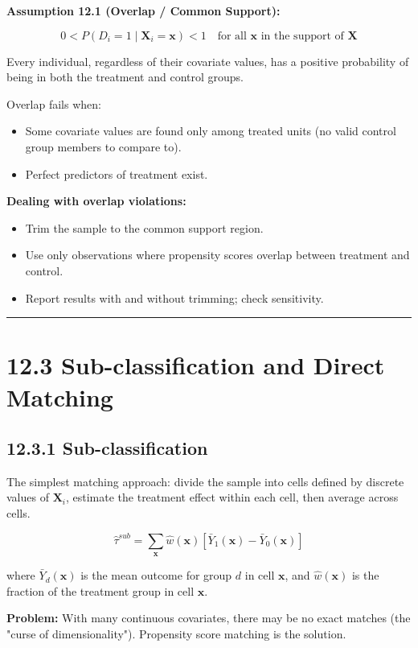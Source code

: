 \textbf{Assumption 12.1 (Overlap / Common Support):}

\[
0 < P(D_i = 1 \mid \mathbf{X}_i = \mathbf{x}) < 1 \quad \text{for all } \mathbf{x} \text{ in the support of } \mathbf{X}
\]

Every individual, regardless of their covariate values, has a positive probability of being in both the treatment and control groups.

Overlap fails when:
\begin{itemize}
\item Some covariate values are found only among treated units (no valid control group members to compare to).
\item Perfect predictors of treatment exist.
\end{itemize}

\textbf{Dealing with overlap violations:}
\begin{itemize}
\item Trim the sample to the common support region.
\item Use only observations where propensity scores overlap between treatment and control.
\item Report results with and without trimming; check sensitivity.
\end{itemize}

\medskip\hrule\medskip

\section{12.3 Sub-classification and Direct Matching}

\subsection{12.3.1 Sub-classification}

The simplest matching approach: divide the sample into cells defined by discrete values of $\mathbf{X}_i$, estimate the treatment effect within each cell, then average across cells.

\[
\hat{\tau}^{sub} = \sum_{\mathbf{x}} \hat{w}(\mathbf{x}) \left[\bar{Y}_{1}(\mathbf{x}) - \bar{Y}_{0}(\mathbf{x})\right]
\]

where $\bar{Y}_{d}(\mathbf{x})$ is the mean outcome for group $d$ in cell $\mathbf{x}$, and $\hat{w}(\mathbf{x})$ is the fraction of the treatment group in cell $\mathbf{x}$.

\textbf{Problem:} With many continuous covariates, there may be no exact matches (the "curse of dimensionality"). Propensity score matching is the solution.


